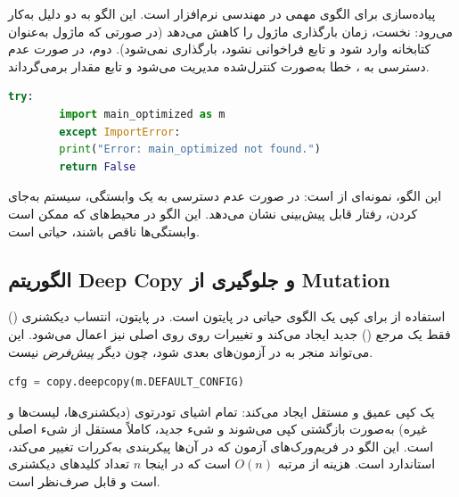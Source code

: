 پیاده‌سازی  برای  الگوی مهمی در مهندسی نرم‌افزار است. این الگو به دو دلیل به‌کار می‌رود: نخست، زمان بارگذاری ماژول را کاهش می‌دهد (در صورتی که ماژول به‌عنوان کتابخانه وارد شود و تابع  فراخوانی نشود،  بارگذاری نمی‌شود). دوم، در صورت عدم دسترسی به ، خطا به‌صورت کنترل‌شده مدیریت می‌شود و تابع مقدار  برمی‌گرداند.

\begin{LTR}
	\begin{lstlisting}[language=Python]
		try:
		import main_optimized as m
		except ImportError:
		print("Error: main_optimized not found.")
		return False
	\end{lstlisting}
\end{LTR}

این الگو، نمونه‌ای از  است: در صورت عدم دسترسی به یک وابستگی، سیستم به‌جای  کردن، رفتار قابل پیش‌بینی نشان می‌دهد. این الگو در محیط‌های  که ممکن است وابستگی‌ها ناقص باشند، حیاتی است.

\subsection{الگوریتم Deep Copy و جلوگیری از Mutation}

استفاده از  برای کپی  یک الگوی حیاتی در پایتون است. در پایتون، انتساب دیکشنری () فقط یک مرجع () جدید ایجاد می‌کند و تغییرات روی  روی  اصلی نیز اعمال می‌شود. این می‌تواند منجر به  در آزمون‌های بعدی شود، چون  دیگر \emph{پیش‌فرض} نیست.

\begin{LTR}
	\begin{lstlisting}[language=Python]
		cfg = copy.deepcopy(m.DEFAULT_CONFIG)
	\end{lstlisting}
\end{LTR}

 یک کپی عمیق و مستقل ایجاد می‌کند: تمام اشیای تودرتوی (دیکشنری‌ها، لیست‌ها و غیره) به‌صورت بازگشتی کپی می‌شوند و شیء جدید، کاملاً مستقل از شیء اصلی است. این الگو در فریم‌ورک‌های آزمون که در آن‌ها پیکربندی به‌کررات تغییر می‌کند، استاندارد است. هزینه  از مرتبه $O(n)$ است که در اینجا $n$ تعداد کلیدهای دیکشنری است و قابل صرف‌نظر است.

